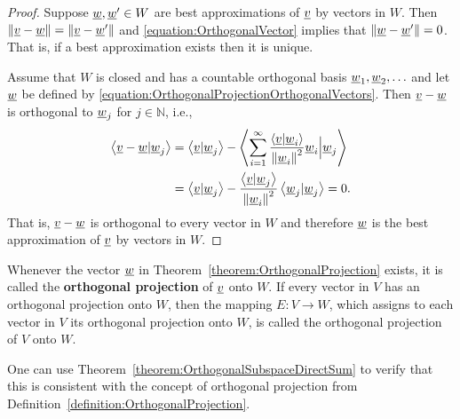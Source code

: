 \begin{proof}
Suppose $\underline{w}, \underline{w}' \in W$ are best approximations of $\underline{v}$ by vectors in $W$.
Then $\left\| \underline{v} - \underline{w} \right\| = \left\| \underline{v} - \underline{w}' \right\|$ and \eqref{equation:OrthogonalVector} implies that $\left\| \underline{w} - \underline{w}' \right\| = 0$.
That is, if a best approximation exists then it is unique.

Assume that $W$ is closed and has a countable orthogonal basis $\underline{w}_1,\underline{w}_2, \ldots$ and let $\underline{w}$ be defined by \eqref{equation:OrthogonalProjectionOrthogonalVectors}.
Then $\underline{v} -\underline{w}$ is orthogonal to $\underline{w}_j$ for $j \in \mathbb{N}$, i.e.,
\begin{equation*}
\begin{split}
\left\langle \underline{v} - \underline{w} | \underline{w}_j \right\rangle
&= \left\langle \underline{v} | \underline{w}_j \right\rangle
- \left\langle \sum_{i=1}^\infty \frac{ \left\langle \underline{v} | \underline{w}_i \right\rangle }{ \left\| \underline{w}_i \right\|^2 } \underline{w}_i \Big| \underline{w}_j \right\rangle \\
&= \left\langle \underline{v} | \underline{w}_j \right\rangle
- \frac{ \left\langle \underline{v} | \underline{w}_j \right\rangle }{ \left\| \underline{w}_i \right\|^2 } \left\langle \underline{w}_j | \underline{w}_j \right\rangle
= 0.
\end{split}
\end{equation*}
That is, $\underline{v} - \underline{w}$ is orthogonal to every vector in $W$ and therefore $\underline{w}$ is the best approximation of $\underline{v}$ by vectors in $W$.
\end{proof}

\begin{definition}
Whenever the vector $\underline{w}$ in Theorem~\ref{theorem:OrthogonalProjection} exists, it is called the \textbf{orthogonal projection} of $\underline{v}$ onto $W$.
If every vector in $V$ has an orthogonal projection onto $W$, then the mapping $E \colon V \rightarrow W$, which assigns to each vector in $V$ its orthogonal projection onto $W$, is called the orthogonal projection of $V$ onto $W$.
\end{definition}

One can use Theorem~\ref{theorem:OrthogonalSubspaceDirectSum} to verify that this is consistent with the concept of orthogonal projection from Definition~\ref{definition:OrthogonalProjection}.


